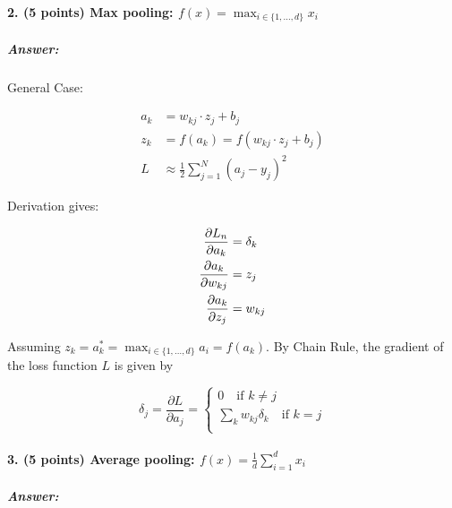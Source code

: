 \documentclass[10pt]{article}
\begin{document}
\paragraph{2. (5 points) Max pooling: $f(x)=\max _{i \in\{1, \ldots, d\}} x_{i}$
}
\subparagraph{Answer: }

General Case:

\begin{align*}
  a_k &= w_{kj}\cdot z_j + b_j\\
  z_k &= f(a_k) = f(w_{kj}\cdot z_j + b_j)\\
  L &\approx \frac{1}{2}\sum_{j=1}^{N}(a_j-y_j)^2
\end{align*}

Derivation gives:

\begin{align*}
  \pdv{L_n}{a_k} &= \delta_k\\
  \pdv{a_k}{w_{kj}} &= z_{j}\\
  \pdv{a_k}{z_j} &= w_{kj}
\end{align*}

Assuming $z_k=a_k^*=\max _{i \in\{1, \ldots, d\}} a_{i}=f(a_k)$.
By Chain Rule, the gradient of the loss function $L$ is given by



$$\delta_{j}=\frac{\partial L}{\partial a_{j}}=\begin{cases}
  0 \quad \text{if } k\neq j\\
  \sum_{k} w_{kj}\delta_k \quad \text{if } k=j\\
\end{cases}$$


\paragraph{3. (5 points) Average pooling: $f(x)=\frac{1}{d} \sum_{i=1}^{d} x_{i}$}
\subparagraph{Answer: }
\end{document}
